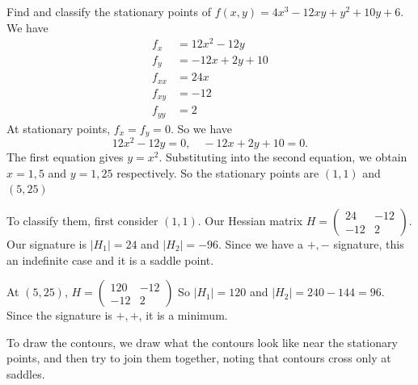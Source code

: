 \documentclass[a4paper]{article}
\begin{document}
\begin{eg}
  Find and classify the stationary points of $f(x, y) = 4x^3 - 12xy + y^2 + 10y + 6$. We have
  \begin{align*}
    f_x &= 12x^2 - 12y\\
    f_y &= -12x + 2y + 10\\
    f_{xx} &= 24x\\
    f_{xy} &= -12\\
    f_{yy} &= 2
  \end{align*}
  At stationary points, $f_x = f_y = 0$. So we have
  \[
    12x^2 - 12y = 0,\quad -12x + 2y + 10 = 0.
  \]
  The first equation gives $y = x^2$. Substituting into the second equation, we obtain $x = 1, 5$ and $y = 1, 25$ respectively. So the stationary points are $(1, 1)$ and $(5, 25)$

  To classify them, first consider $(1, 1)$. Our Hessian matrix $H =
  \begin{pmatrix}
    24 & -12\\
    -12 & 2
  \end{pmatrix}$. Our signature is $|H_1| = 24$ and $|H_2| = -96$. Since we have a $+, -$ signature, this an indefinite case and it is a saddle point.

  At $(5, 25)$, $H =
  \begin{pmatrix}
    120 & -12\\
    -12 & 2
  \end{pmatrix}$
  So $|H_1| = 120$ and $|H_2| = 240 - 144 = 96$. Since the signature is $+, +$, it is a minimum.

  To draw the contours, we draw what the contours look like near the stationary points, and then try to join them together, noting that contours cross only at saddles.
  \begin{center}
  \end{center}
\end{eg}
\end{document}
